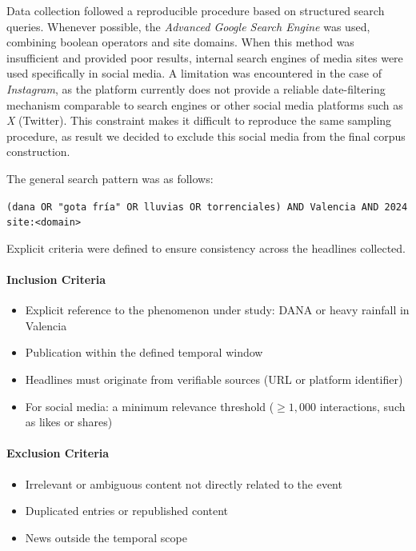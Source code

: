 Data collection followed a reproducible procedure based on structured search queries. Whenever possible, the \textit{Advanced Google
Search Engine} was used, combining boolean operators and site domains. When this method was insufficient and provided poor results,
internal search engines of media sites were used specifically in social media. A limitation was encountered in the case of 
\emph{Instagram}, as the platform currently does not provide a reliable date-filtering mechanism comparable to
search engines or other social media platforms such as \emph{X} (Twitter). This constraint makes it difficult to reproduce the same sampling
procedure, as result we decided to exclude this social media from the final corpus construction.


The general search pattern was as follows:

\begin{tcolorbox}[colback=gray!10,colframe=gray]
\centering
\texttt{(dana OR "gota fría" OR lluvias OR torrenciales) AND Valencia AND 2024 site:<domain>}
\end{tcolorbox}

Explicit criteria were defined to ensure consistency across the headlines collected.

\paragraph{Inclusion Criteria}
\begin{itemize}
    \item Explicit reference to the phenomenon under study: DANA or heavy rainfall in Valencia
    \item Publication within the defined temporal window
    \item Headlines must originate from verifiable sources (URL or platform identifier)
    \item For social media: a minimum relevance threshold ($\geq 1,000$ interactions, such as likes or shares)
\end{itemize}

\paragraph{Exclusion Criteria}
\begin{itemize}
    \item Irrelevant or ambiguous content not directly related to the event
    \item Duplicated entries or republished content
    \item News outside the temporal scope
\end{itemize}


